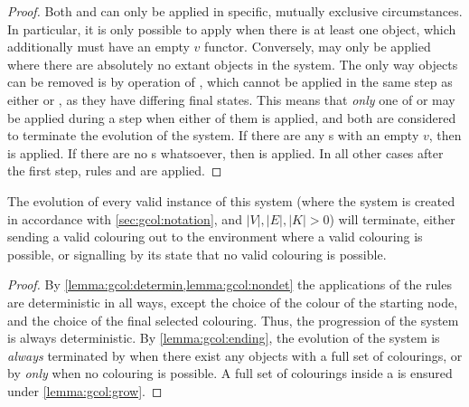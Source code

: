 \begin{proof}
Both  and  can only be applied in specific, mutually exclusive circumstances.  In particular, it is only possible to apply  when there is at least one \bo{} object, which additionally must have an empty \(v\) \gls{functor}.  Conversely,  may only be applied where there are absolutely no extant \bo{} objects in the system.  The only way \bo{} objects can be removed is by operation of , which cannot be applied in the same step as either  or , as they have differing final states.  This means that \emph{only} one of  or  may be applied during a step when either of them is applied, and both are considered to terminate the evolution of the system.  If there are any \bo{}s with an empty \(v\), then  is applied.  If there are no \bo{}s whatsoever, then  is applied.  In all other cases after the first step, rules  and  are applied.
\end{proof}

\begin{theorem}
The evolution of every valid instance of this system (where the system is created in accordance with \cref{sec:gcol:notation}, and \(|V|, |E|, |K| > 0\)) will terminate, either sending a valid colouring out to the environment where a valid colouring is possible, or signalling by its state that no valid colouring is possible.
\end{theorem}

\begin{proof}
By \cref{lemma:gcol:determin,lemma:gcol:nondet} the applications of the rules are deterministic in all ways, except the choice of the colour of the starting node, and the choice of the final selected colouring.  Thus, the progression of the system is always deterministic.  By \cref{lemma:gcol:ending}, the evolution of the system is \emph{always} terminated by  when there exist any \bo{} objects with a full set of colourings, or by  \emph{only} when no colouring is possible.  A full set of colourings inside a \bo{} is ensured under \cref{lemma:gcol:grow}.
\end{proof}

